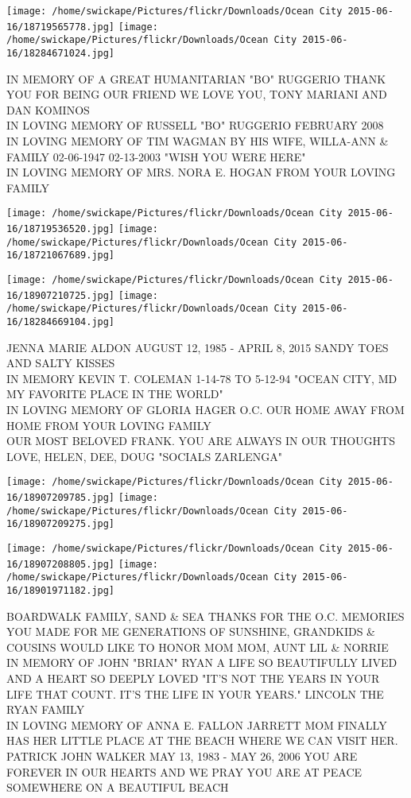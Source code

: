 \documentclass[10pt,letterpaper]{article}
\begin{document}
\texttt{[image: /home/swickape/Pictures/flickr/Downloads/Ocean City 2015-06-16/18719565778.jpg]}
\texttt{[image: /home/swickape/Pictures/flickr/Downloads/Ocean City 2015-06-16/18284671024.jpg]}

IN MEMORY OF A GREAT HUMANITARIAN "BO" RUGGERIO THANK YOU FOR BEING OUR FRIEND WE LOVE YOU, TONY MARIANI AND DAN KOMINOS\\
IN LOVING MEMORY OF RUSSELL "BO" RUGGERIO FEBRUARY 2008\\
IN LOVING MEMORY OF TIM WAGMAN BY HIS WIFE, WILLA{-}ANN \& FAMILY 02{-}06{-}1947 02{-}13{-}2003 "WISH YOU WERE HERE"\\
IN LOVING MEMORY OF MRS. NORA E. HOGAN FROM YOUR LOVING FAMILY
\pagebreak

\texttt{[image: /home/swickape/Pictures/flickr/Downloads/Ocean City 2015-06-16/18719536520.jpg]}
\texttt{[image: /home/swickape/Pictures/flickr/Downloads/Ocean City 2015-06-16/18721067689.jpg]}

\texttt{[image: /home/swickape/Pictures/flickr/Downloads/Ocean City 2015-06-16/18907210725.jpg]}
\texttt{[image: /home/swickape/Pictures/flickr/Downloads/Ocean City 2015-06-16/18284669104.jpg]}

JENNA MARIE ALDON AUGUST 12, 1985 {-} APRIL 8, 2015 SANDY TOES AND SALTY KISSES\\
IN MEMORY KEVIN T. COLEMAN 1{-}14{-}78 TO 5{-}12{-}94 "OCEAN CITY, MD MY FAVORITE PLACE IN THE WORLD"\\
IN LOVING MEMORY OF GLORIA HAGER O.C. OUR HOME AWAY FROM HOME FROM YOUR LOVING FAMILY\\
OUR MOST BELOVED FRANK.  YOU ARE ALWAYS IN OUR THOUGHTS LOVE, HELEN, DEE, DOUG "SOCIALS ZARLENGA"
\pagebreak

\texttt{[image: /home/swickape/Pictures/flickr/Downloads/Ocean City 2015-06-16/18907209785.jpg]}
\texttt{[image: /home/swickape/Pictures/flickr/Downloads/Ocean City 2015-06-16/18907209275.jpg]}

\texttt{[image: /home/swickape/Pictures/flickr/Downloads/Ocean City 2015-06-16/18907208805.jpg]}
\texttt{[image: /home/swickape/Pictures/flickr/Downloads/Ocean City 2015-06-16/18901971182.jpg]}

BOARDWALK FAMILY, SAND \& SEA THANKS FOR THE O.C. MEMORIES YOU MADE FOR ME GENERATIONS OF SUNSHINE, GRANDKIDS \& COUSINS WOULD LIKE TO HONOR MOM MOM, AUNT LIL \& NORRIE\\
IN MEMORY OF JOHN "BRIAN" RYAN A LIFE SO BEAUTIFULLY LIVED AND A HEART SO DEEPLY LOVED "IT'S NOT THE YEARS IN YOUR LIFE THAT COUNT.  IT'S THE LIFE IN YOUR YEARS."  LINCOLN THE RYAN FAMILY\\
IN LOVING MEMORY OF ANNA E. FALLON JARRETT MOM FINALLY HAS HER LITTLE PLACE AT THE BEACH WHERE WE CAN VISIT HER.\\
PATRICK JOHN WALKER MAY 13, 1983 {-} MAY 26, 2006 YOU ARE FOREVER IN OUR HEARTS AND WE PRAY YOU ARE AT PEACE SOMEWHERE ON A BEAUTIFUL BEACH
\pagebreak
\end{document}
